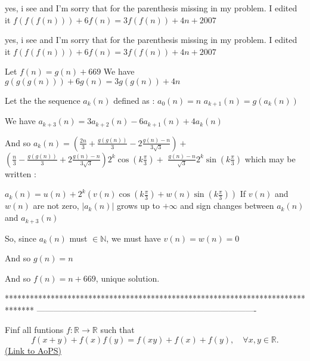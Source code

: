 \begin{mysolution}
	yes, i see and I'm sorry that  for the parenthesis missing in my problem. I edited it
$ f(f(f(n)))+6f(n)=3f(f(n))+4n+2007$
\end{mysolution}



\begin{mysolution}
	\begin{tcolorbox}yes, i see and I'm sorry that  for the parenthesis missing in my problem. I edited it
$ f(f(f(n))) + 6f(n) = 3f(f(n)) + 4n + 2007$\end{tcolorbox}

Let $ f(n)=g(n)+669$ We have $ g(g(g(n))) + 6g(n) = 3g(g(n)) + 4n$

Let the the sequence $ a_k(n)$ defined as :
$ a_0(n)=n$
$ a_{k+1}(n)=g(a_k(n))$

We have $ a_{k+3}(n)=3a_{k+2}(n)-6a_{k+1}(n)+4a_k(n)$

And so $ a_k(n)=(\frac{2n}{3}+\frac{g(g(n))}{3}-2\frac{g(n)-n}{3\sqrt{3}})+$ $ (\frac{n}{3}-\frac{g(g(n))}{3}+2\frac{g(n)-n}{3\sqrt{3}})2^k\cos(k\frac{\pi}{3})+$ $ \frac{g(n)-n}{\sqrt{3}}2^k\sin(k\frac{\pi}{3})$ which may be written :

$ a_k(n)=u(n)+2^k(v(n)\cos(k\frac{\pi}{3})+w(n)\sin(k\frac{\pi}{3}))$
If $ v(n)$ and $ w(n)$ are not zero, $ |a_k(n)|$ grows up to $ +\infty$ and sign changes between $ a_k(n)$ and $ a_{k+3}(n)$

So, since $ a_k(n)$ must $ \in\mathbb{N}$, we must have $ v(n)=w(n)=0$

And so $ g(n)=n$

And so $ f(n)=n+669$, unique solution.
\end{mysolution}
*******************************************************************************
-------------------------------------------------------------------------------

\begin{problem}
	Finf all funtions $ f: \mathbb{R}\to\mathbb{R}$ such that
\[f(x+y)+f(x)f(y)=f(xy)+f(x)+f(y),\quad \forall x,y\in\mathbb{R}.\]
	\flushright \href{https://artofproblemsolving.com/community/c6h178957}{(Link to AoPS)}
\end{problem}



